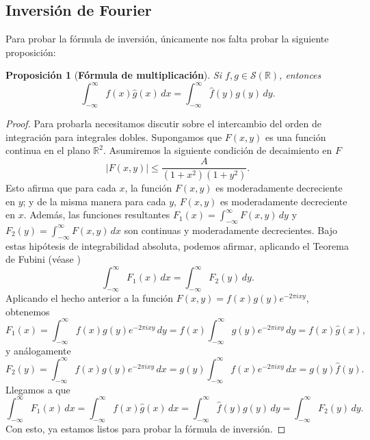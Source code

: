 \documentclass[12pt]{article}
\newcommand{\R}{\mathbb{R}}
\newcommand{\Sc}{\mathcal{S}(\mathbb{R})}
\theoremstyle{plain}
\newtheorem{proposicion}[teorema]{Proposición}
\theoremstyle{definition}
\numberwithin{equation}{section}
\begin{document}
        \subsection{Inversión de Fourier}
            Para probar la fórmula de inversión, únicamente nos falta probar la siguiente proposición:
            \begin{proposicion}[\textbf{Fórmula de multiplicación}]
                Si \(f, g \in \Sc\), entonces
                \begin{equation*}
                    \int_{-\infty}^{\infty} f(x)\hat{g}(x) \,dx = \int_{-\infty}^{\infty} \hat{f}(y)g(y) \,dy.
                \end{equation*}
            \end{proposicion}
            \begin{proof}
                Para probarla necesitamos discutir sobre el intercambio del orden de integración para integrales dobles. Supongamos que \(F(x,y)\) es una función continua en el plano \(\R^2\). Asumiremos la siguiente condición de decaimiento en \(F\)
                \begin{equation*}
                    \left\lvert F(x,y) \right\rvert \le \frac{A}{(1+x^2)(1+y^2)}.
                \end{equation*}
                Esto afirma que para cada \(x\), la función \(F(x,y)\) es moderadamente decreciente en \(y\); y de la misma manera para cada \(y\), \(F(x,y)\) es moderadamente decreciente en \(x\). Además, las funciones resultantes \(F_1(x) = \int_{-\infty}^{\infty} F(x,y) \,dy\) y \(F_2(y) = \int_{-\infty}^{\infty} F(x,y) \,dx\) son continuas y moderadamente decrecientes. Bajo estas hipótesis de integrabilidad absoluta, podemos afirmar, aplicando el Teorema de Fubini (véase \cite[Appendix C.2 y C.3]{stein_fourier})
                \begin{equation*}
                    \int_{-\infty}^{\infty} F_1(x) \,dx = \int_{-\infty}^{\infty} F_2(y) \,dy.
                \end{equation*}
                Aplicando el hecho anterior a la función \(F(x,y) = f(x)g(y)e^{-2\pi ixy}\), obtenemos
                \begin{equation*}
                    F_1(x) = \int_{-\infty}^{\infty} f(x)g(y)e^{-2\pi ixy} \,dy = f(x) \int_{-\infty}^{\infty} g(y)e^{-2\pi ixy} \,dy = f(x)\hat{g}(x),
                \end{equation*}
                y análogamente
                \begin{equation*}
                    F_2(y) = \int_{-\infty}^{\infty} f(x)g(y)e^{-2\pi ixy} \,dx = g(y) \int_{-\infty}^{\infty} f(x)e^{-2\pi ixy} \,dx = g(y)\hat{f}(y).
                \end{equation*}
                Llegamos a que
                \begin{equation*}
                    \int_{-\infty}^{\infty} F_1(x) \,dx = \int_{-\infty}^{\infty} f(x)\hat{g}(x) \,dx = \int_{-\infty}^{\infty} \hat{f}(y)g(y) \,dy = \int_{-\infty}^{\infty} F_2(y) \,dy.
                \end{equation*}
                Con esto, ya estamos listos para probar la fórmula de inversión.
            \end{proof}
\end{document}
